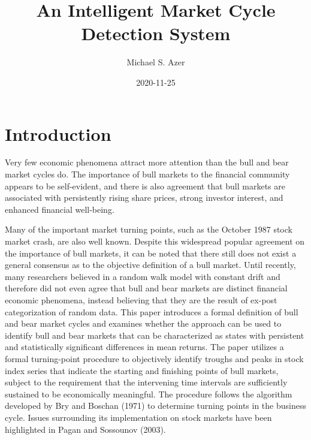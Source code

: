 \documentclass[]{book}
\title{An Intelligent Market Cycle Detection System}
\author{Michael S. Azer}
\date{2020-11-25}
\begin{document}
\maketitle

{
\setcounter{tocdepth}{1}
\tableofcontents
}
\listoftables
\listoffigures
\hypertarget{introduction}{%
\chapter{Introduction}\label{introduction}}

Very few economic phenomena attract more attention than the bull and bear market cycles do. The importance of bull markets to the financial community appears to be self-evident, and there is also agreement that bull markets are associated with persistently rising share prices, strong investor interest, and enhanced financial well-being.

Many of the important market turning points, such as the October 1987 stock market crash, are also well known. Despite this widespread popular agreement on the importance of bull markets, it can be noted that there still does not exist a general consensus as to the objective definition of a bull market. Until recently, many researchers believed in a random walk model with constant drift and therefore did not even agree that bull and bear markets are distinct financial economic phenomena, instead believing that they are the result of ex-post categorization of random data. This paper introduces a formal definition of bull and bear market cycles and examines whether the approach can be used to identify bull and bear markets that can be characterized as states with persistent and statistically significant differences in mean returns. The paper utilizes a formal turning-point procedure to objectively identify troughs and peaks in stock index series that indicate the starting and finishing points of bull markets, subject to the requirement that the intervening time intervals are sufficiently sustained to be economically meaningful. The procedure follows the algorithm developed by Bry and Boschan (1971) to determine turning points in the business cycle. Issues surrounding its implementation on stock markets have been highlighted in Pagan and Sossounov (2003).
\end{document}

